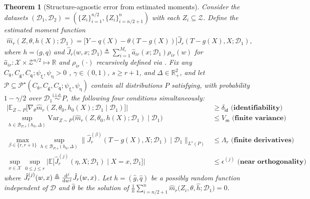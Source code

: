 \documentclass{article}
\def\eps{{\epsilon}}
\def\gB{{\mathcal{B}}}
\def\gD{{\mathcal{D}}}
\def\gP{{\mathcal{P}}}
\def\gX{{\mathcal{X}}}
\def\gZ{{\mathcal{Z}}}
\newcommand{\E}{\mathbb{E}}
\newcommand{\R}{\mathbb{R}}
\newcommand{\dd}{\textup{d}}
\def\defeq{\triangleq} %
\newtheorem{theorem}{Theorem}[section]
\newcommand{\iidsim}{\overset{\text{i.i.d.}}{\sim}}
\begin{document}
\begin{theorem}[Structure-agnostic error from estimated moments]
\label{thm:approx-zero-derivative}
Consider the datasets $(\gD_1, \gD_2) = (\{Z_i\}_{i=1}^{n/2},\{Z_i\}_{i=n/2+1}^{n})$ with each $Z_i \subseteq\gZ$. %
Define the estimated moment function
\begin{equation}
    \label{eq:estimated-moment-function}
    \begin{aligned}
    \hat{m}_{r}\left(Z,\theta,h(X);\gD_1\right) = \big[ Y-q(X)-\theta(T-g(X)) \big] \hat{J}_r(T-g(X),X;\gD_1), 
    \end{aligned}
\end{equation}
where $h=\big(g,q\big)$ and $\hat{J}_r\big(w,x;\gD_1\big)\defeq\sum_{i=1}^{M_r}\hat{a}_{ir}(x;\gD_1)\rho_{ir}(w)$ for $\hat{a}_{ir}:\gX\times\gZ^{n/2}\mapsto\R$ and $\rho_{ir}(\cdot)$ recursively defined via . 
    Fix any $C_{\uptheta},C_{\mathsf{g}},C_{\mathsf{q}};\psi_{\upxi}, \psi_{\upeta} > 0$ , $\gamma\in(0,1)$,  $s \geq r+1$, and $\Delta\in\R_+^2$, and let $\gP\subseteq\gP^{\star}(C_{\uptheta},C_{\mathsf{g}},C_{\mathsf{q}};\psi_{\upxi}, \psi_{\upeta})$ contain all distributions $P$ satisfying, with probability $1-\gamma/2$ over $\gD_1\iidsim P$, the following four conditions simultaneously:
    \begin{align}
    \textstyle
        \bigl|\E_{Z\sim P}\bigl[\nabla_{\theta}\hat{m}_r(Z,\theta_0,h_0(X);\gD_1 \mid \gD_1)\bigr]\bigr| 
        &\geq \delta_{\mathsf{id}}
        \textbf{ (identifiability)}
        \label{eq:identifiability}
        \\ 
        \sup_{h\in\gB_{P,s}(h_0,\Delta)}\mathrm{Var}_{Z\sim P}\bigl(\hat{m}_r(Z,\theta_0,h(X);\gD_1)\mid \gD_1\bigr) &\leq V_{\mathsf{m}}
        \textbf{ (finite variance)}
        \label{eq:finite-variance} \\
        \max_{\beta\in\{r,r+1\}}\sup_{h\in\gB_{P,s}(h_0,\Delta)} \big\|\hat{J}_r^{(\beta)}(T-g(X),X;\gD_1)\mid \gD_1\big\|_{L^{s}(P)} &\leq \Lambda_r \textbf{ (finite derivatives)} \label{eq:finite-derivative} \\
        \sup_{x\in\gX}\sup_{0\leq j\leq r}\big|\E\big[ \hat{J}_r^{(j)}(\eta,X;\gD_1) \mid X=x, \gD_1  \big]\big| &\leq \eps^{(j)}  \textbf{ (near orthogonality)}\label{eq:approx-orthogonality-general-form}
    \end{align}
    where $\hat{J}_r^{(j)}(w,x)\defeq\frac{\dd^j}{\dd w^j}\hat{J}_r(w,x)$.
    Let $\hat{h}=(\hat{g},\hat{q})$ be a possibly random function independent of $\gD$ and  $\hat{\theta}$ be the solution of $\frac{1}{n}\sum_{i=n/2+1}^n \hat{m}_r\big(Z_i,\theta,\hat{h};\gD_1\big) = 0$. 

\end{theorem}
\end{document}
